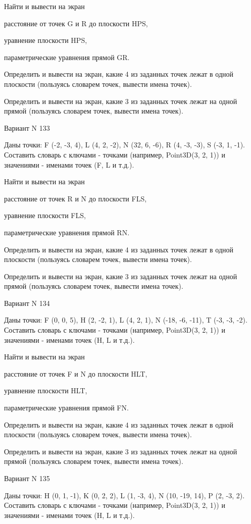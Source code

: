 \documentclass[11pt]{report}
\begin{document}
 
Найти и вывести на экран


расстояние от точек G и R до плоскости HPS,

 
уравнение плоскости HPS,

 
параметрические уравнения прямой GR.


Определить и вывести на экран, какие 4 из заданных точек лежат в одной плоскости (пользуясь словарем точек, вывести имена точек).


Определить и вывести на экран, какие 3 из заданных точек лежат на одной прямой (пользуясь словарем точек, вывести имена точек).

Вариант N 133

Даны точки: F (-2, -3, 4), L (4, 2, -2), N (32, 6, -6), R (4, -3, -3), S (-3, 1, -1).
Составить словарь с ключами - точками (например, Point3D(3, 2, 1)) и значениями - именами точек (F, L и т.д.).

 
Найти и вывести на экран


расстояние от точек R и N до плоскости FLS,

 
уравнение плоскости FLS,

 
параметрические уравнения прямой RN.


Определить и вывести на экран, какие 4 из заданных точек лежат в одной плоскости (пользуясь словарем точек, вывести имена точек).


Определить и вывести на экран, какие 3 из заданных точек лежат на одной прямой (пользуясь словарем точек, вывести имена точек).

Вариант N 134

Даны точки: F (0, 0, 5), H (2, -2, 1), L (4, 2, 1), N (-18, -6, -11), T (-3, -3, -2).
Составить словарь с ключами - точками (например, Point3D(3, 2, 1)) и значениями - именами точек (H, L и т.д.).

 
Найти и вывести на экран


расстояние от точек F и N до плоскости HLT,

 
уравнение плоскости HLT,

 
параметрические уравнения прямой FN.


Определить и вывести на экран, какие 4 из заданных точек лежат в одной плоскости (пользуясь словарем точек, вывести имена точек).


Определить и вывести на экран, какие 3 из заданных точек лежат на одной прямой (пользуясь словарем точек, вывести имена точек).

Вариант N 135

Даны точки: H (0, 1, -1), K (0, 2, 2), L (1, -3, 4), N (10, -19, 14), P (2, -3, 2).
Составить словарь с ключами - точками (например, Point3D(3, 2, 1)) и значениями - именами точек (H, L и т.д.).
\end{document}
